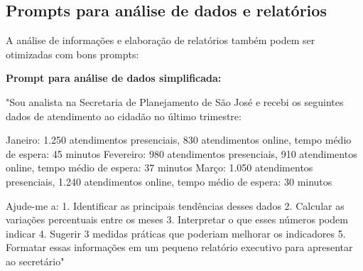 \documentclass[12pt,a4paper]{book}
\begin{document}

\subsection{Prompts para análise de dados e relatórios}

A análise de informações e elaboração de relatórios também podem ser otimizadas com bons prompts:

\begin{tcolorbox}[exemplo]
\textbf{Prompt para análise de dados simplificada:}

"Sou analista na Secretaria de Planejamento de São José e recebi os seguintes dados de atendimento ao cidadão no último trimestre:

Janeiro: 1.250 atendimentos presenciais, 830 atendimentos online, tempo médio de espera: 45 minutos
Fevereiro: 980 atendimentos presenciais, 910 atendimentos online, tempo médio de espera: 37 minutos
Março: 1.050 atendimentos presenciais, 1.240 atendimentos online, tempo médio de espera: 30 minutos

Ajude-me a:
1. Identificar as principais tendências desses dados
2. Calcular as variações percentuais entre os meses
3. Interpretar o que esses números podem indicar
4. Sugerir 3 medidas práticas que poderiam melhorar os indicadores
5. Formatar essas informações em um pequeno relatório executivo para apresentar ao secretário"
\end{tcolorbox}
\end{document}
